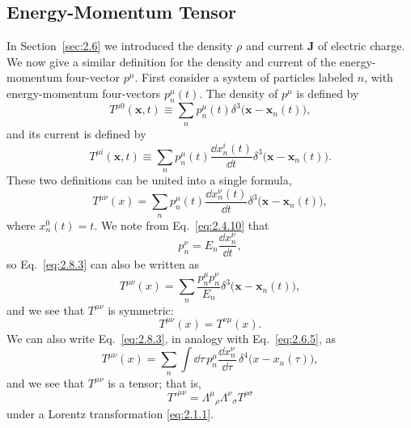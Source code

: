 
\subsection{Energy-Momentum Tensor}\label{sec:2.8}

In Section~\ref{sec:2.6} we introduced the density \(\rho\) and current
\(\mathbf J\) of electric charge. We now give a similar definition for the
density and current of the energy-momentum four-vector \(p^\mu\). First
consider a system of particles labeled \(n\), with energy-momentum four-vectors
\(p_n^\mu(t)\). The density of \(p^\mu\) is defined by
\begin{equation}
  T^{\mu0}(\mathbf x,t)
  \equiv\sum_n p_n^\mu(t)
  \delta^3\bigl(\mathbf x-\mathbf x_n(t)\bigr),
  \tag{2.8.1}\label{eq:2.8.1}
\end{equation}
and its current is defined by
\begin{equation}
  T^{\mu i}(\mathbf x,t)
  \equiv\sum_n p_n^\mu(t)\frac{\dd x_n^i(t)}{\dd t}
  \delta^3\bigl(\mathbf x-\mathbf x_n(t)\bigr).
  \tag{2.8.2}\label{eq:2.8.2}
\end{equation}
These two definitions can be united into a single formula,
\begin{equation}
  T^{\mu\nu}(x)
  =\sum_n p_n^\mu(t)\frac{\dd x_n^\nu(t)}{\dd t}
  \delta^3\bigl(\mathbf x-\mathbf x_n(t)\bigr),
  \tag{2.8.3}\label{eq:2.8.3}
\end{equation}
where \(x_n^0(t)=t\). We note from Eq.~\eqref{eq:2.4.10} that
\[
  p_n^\nu=E_n\frac{\dd x_n^\nu}{\dd t},
\]
so Eq.~\eqref{eq:2.8.3} can also be written as
\begin{equation}
  T^{\mu\nu}(x)
  =\sum_n\frac{p_n^\mu p_n^\nu}{E_n}
  \delta^3\bigl(\mathbf x-\mathbf x_n(t)\bigr),
  \tag{2.8.4}\label{eq:2.8.4}
\end{equation}
and we see that \(T^{\mu\nu}\) is symmetric:
\begin{equation}
  T^{\mu\nu}(x)=T^{\nu\mu}(x).
  \tag{2.8.5}\label{eq:2.8.5}
\end{equation}
We can also write Eq.~\eqref{eq:2.8.3}, in analogy with
Eq.~\eqref{eq:2.6.5}, as
\begin{equation}
  T^{\mu\nu}(x)
  =\sum_n\int \dd\tau\,p_n^\mu
    \frac{\dd x_n^\nu}{\dd\tau}\,
    \delta^4\bigl(x-x_n(\tau)\bigr),
  \tag{2.8.5a}\label{eq:2.8.5a}
\end{equation}
and we see that \(T^{\mu\nu}\) is a tensor; that is,
\[
  T'^{\mu\nu}
  =\Lambda^\mu{}_\rho\Lambda^\nu{}_\sigma T^{\rho\sigma}
\]
under a Lorentz transformation \eqref{eq:2.1.1}.

